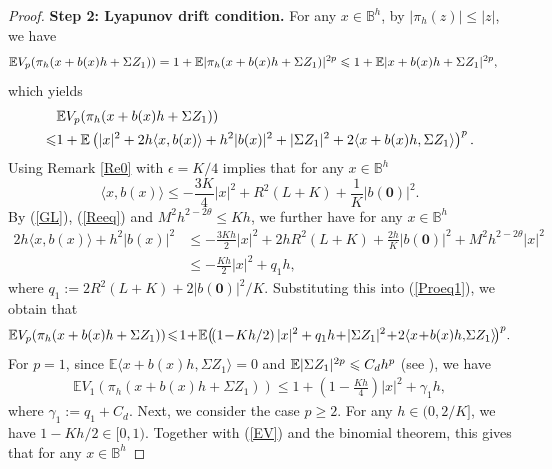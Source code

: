\documentclass[aap]{imsart}
\theoremstyle{plain}
\theoremstyle{definition}
\begin{document}
\begin{proof}
{\bf Step 2: Lyapunov drift condition.} For any $x\in \mathbb{B}^h$, by \(|\pi_h(z)|\leqslant |z|\), we have
\begin{align*}
\mathbb{E}V_p(\pi_h(x+b(x)h+\Sigma Z_1)) &= 1+\mathbb{E}|\pi_h(x+b(x)h+\Sigma Z_1)|^{2p}\leqslant 1+\mathbb{E}|x+b(x)h+\Sigma Z_1|^{2p},
\end{align*}
which yields 
\begin{equation}\label{Proeq1}
\begin{aligned}
&\mathbb{E}V_p(\pi_h(x+b(x)h+\Sigma Z_1)) \\
\leqslant &1+\mathbb{E}\left(|x|^2+2h\langle x, b(x) \rangle+h^2|b(x)|^2+|\Sigma Z_1|^2+2\langle x+b(x)h,\Sigma Z_1 \rangle\right)^p.
\end{aligned}
\end{equation}
Using Remark \ref{Re0} with $\epsilon = K/4$ implies that for any $x\in\mathbb{B}^h$
\begin{equation}\label{Reeq}
\langle x, b(x)\rangle \leqslant -\frac{3K}{4}|x|^2+R^2(L+K)+\frac{1}{K}|b(\mathbf{0})|^2.
\end{equation}
By (\ref{GL}), (\ref{Reeq}) and $M^2h^{2-2\theta}\leqslant Kh$, we further have for any $x\in\mathbb{B}^h$
\begin{align*}
2h\langle x, b(x) \rangle+h^2|b(x)|^2 &\leqslant-\frac{3Kh}{2}|x|^2+2hR^2(L+K)+\frac{2h}{K}|b(\mathbf{0})|^2+M^2h^{2-2\theta} \left|x\right|^2\\
&\leqslant -\frac{Kh}{2}|x|^2+q_1h,
\end{align*}
where $q_1 := 2R^2(L+K)+2|b(\mathbf{0})|^2/K$.
Substituting this into (\ref{Proeq1}), we obtain that
\begin{equation}\label{EV}
\mathbb{E}V_p(\pi_h(x+b(x)h+\Sigma Z_1))\!\leqslant\! 1\!+\!\E\!\left(\!\left(1\!-\!Kh/2\right)|x|^2+q_1h\!+\!|\Sigma Z_1|^2\!+\!2\langle x\!+\!b(x)h, \!\Sigma Z_1 \rangle\!\right)^p\!.
\end{equation}
For $p =1$, since $\mathbb{E}\langle x+b(x)h, \Sigma Z_1 \rangle = 0$ and $\mathbb{E}|\Sigma Z_1|^{2p} \leqslant C_dh^p$ (see \cite{BMSC}), we have
\begin{equation}\label{EV1}
\begin{aligned}
\mathbb{E}V_1(\pi_h(x+b(x)h+\Sigma Z_1))\leqslant 1+\left(1-\frac{Kh}{4}\right)|x|^2+\gamma_1 h,
\end{aligned}
\end{equation}
where $\gamma_1:= q_1+C_d$. Next, we consider the case $p\geqslant 2$. For any $h\in(0, 2/K]$, we have \(1-Kh/2\in[0,1)\). Together with (\ref{EV}) and the binomial theorem, this gives that for any $x\in\mathbb{B}^h$

\end{proof}
\end{document}
